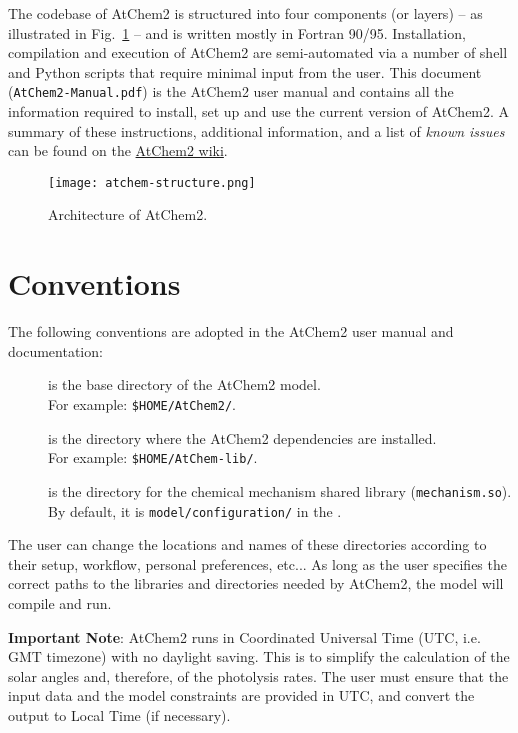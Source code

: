 The codebase of AtChem2 is structured into four components (or layers)
-- as illustrated in Fig.~\ref{fig:atchem-arch} -- and is written
mostly in Fortran 90/95. Installation, compilation and execution of
AtChem2 are semi-automated via a number of shell and Python scripts
that require minimal input from the user. This document
(\texttt{AtChem2-Manual.pdf}) is the AtChem2 user manual and contains
all the information required to install, set up and use the current
version of AtChem2. A summary of these instructions, additional
information, and a list of \emph{known issues} can be found on the
\href{https://github.com/AtChem/AtChem2/wiki}{AtChem2 wiki}.

\begin{figure}[htb]
  \centering
  \texttt{[image: atchem-structure.png]}
  \caption{Architecture of AtChem2.}
  \label{fig:atchem-arch}
\end{figure}

\section{Conventions} \label{sec:conventions}

The following conventions are adopted in the AtChem2 user manual and
documentation:

\begin{description}
\item[\maindir] is the base directory of the AtChem2 model.\\
  For example: \texttt{\$HOME/AtChem2/}.
\item[\depdir] is the directory where the AtChem2 dependencies are installed.\\
  For example: \texttt{\$HOME/AtChem-lib/}.
\item[\sharedir] is the directory for the chemical mechanism shared
  library (\texttt{mechanism.so}).\\
  By default, it is \texttt{model/configuration/} in the \maindir.
\end{description}

The user can change the locations and names of these directories
according to their setup, workflow, personal preferences, etc... As
long as the user specifies the correct paths to the libraries and
directories needed by AtChem2, the model will compile and run.

\textbf{Important Note}: AtChem2 runs in Coordinated Universal Time
(UTC, i.e. GMT timezone) with no daylight saving. This is to simplify
the calculation of the solar angles and, therefore, of the photolysis
rates. The user must ensure that the input data and the model
constraints are provided in UTC, and convert the output to Local Time
(if necessary).

